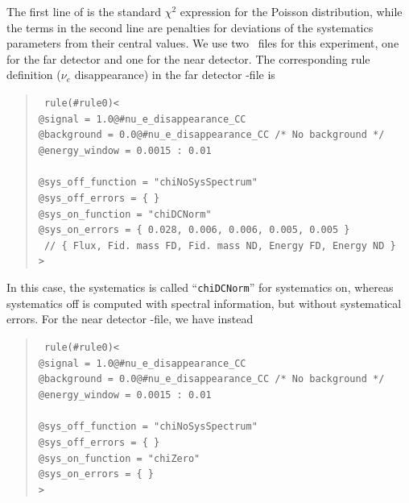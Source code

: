 %
The first line of  is the standard $\chi^2$ expression for
the Poisson distribution, while the terms in the second line are penalties
for deviations of the systematics parameters from their central values. 
%
We use two \AEDL\ files for this experiment, one for the far detector and one for the
near detector.
The corresponding rule definition ($\nu_e$ disappearance) in the far detector \AEDL -file is
\begin{quote}
{\tt
rule(\#rule0)< \\
\hspace*{0.5cm}        @signal     = 1.0@\#nu\_e\_disappearance\_CC \\
\hspace*{0.5cm}        @background = 0.0@\#nu\_e\_disappearance\_CC   /* No background */ \\
\hspace*{0.5cm} @energy\_window = 0.0015 : 0.01 \\
\\
\hspace*{0.5cm}        @sys\_off\_function = "chiNoSysSpectrum" \\
\hspace*{0.5cm}        @sys\_off\_errors   = \{ \} \\
\hspace*{0.5cm}        @sys\_on\_function  = "chiDCNorm" \\
\hspace*{0.5cm}        @sys\_on\_errors    = \{ 0.028,    0.006,        0.006,       0.005,     0.005   \} \\
\hspace*{0.5cm}        \mbox{ // \{ Flux, Fid. mass FD, Fid. mass ND, Energy FD, Energy ND \} } \\
> 
}
\end{quote}
In this case, the systematics is called ``{\tt chiDCNorm}'' for systematics on, whereas systematics
off is computed with spectral information, but without systematical errors.
For the near detector \AEDL -file, we have instead
\begin{quote}
{\tt
rule(\#rule0)< \\
\hspace*{0.5cm}        @signal     = 1.0@\#nu\_e\_disappearance\_CC \\
\hspace*{0.5cm}        @background = 0.0@\#nu\_e\_disappearance\_CC   /* No background */ \\
\hspace*{0.5cm} @energy\_window = 0.0015 : 0.01 \\
\\
\hspace*{0.5cm}        @sys\_off\_function = "chiNoSysSpectrum" \\
\hspace*{0.5cm}        @sys\_off\_errors   = \{ \} \\
\hspace*{0.5cm}        @sys\_on\_function  = "chiZero" \\
\hspace*{0.5cm}        @sys\_on\_errors    = \{ \} \\
> 
}
\end{quote}

